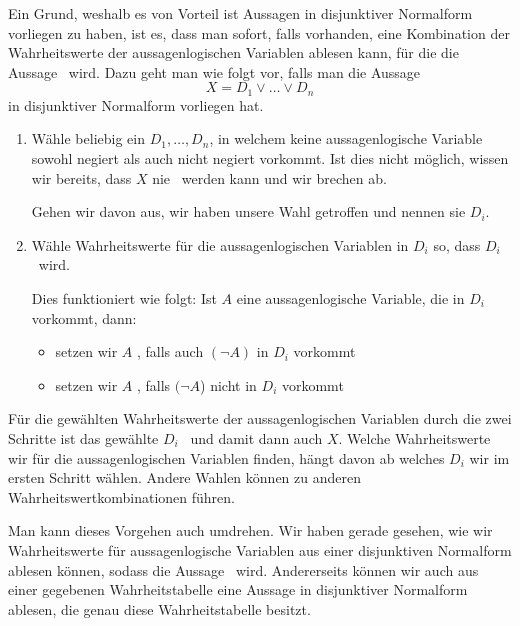 \documentclass[../../main.tex]{subfiles}
\begin{document}
    Ein Grund, weshalb es von Vorteil ist Aussagen in disjunktiver Normalform
    vorliegen zu haben, ist es, dass man sofort, falls vorhanden, 
    eine Kombination der Wahrheitswerte der aussagenlogischen
    Variablen ablesen kann, für die die Aussage \wahr\ wird. 
    Dazu geht man wie folgt vor, falls man 
    die Aussage
    \[X= D_1 \lor \dots \lor D_n\]
    in disjunktiver Normalform vorliegen hat.
    \begin{enumerate}
        \item Wähle beliebig ein $D_1,\dots,D_n$, in welchem keine 
        aussagenlogische Variable sowohl negiert als auch nicht negiert vorkommt. 
        Ist dies nicht möglich, wissen wir bereits, dass $X$ nie \wahr\ werden kann 
        und wir brechen ab.
        
        Gehen wir davon aus, wir haben unsere Wahl getroffen und nennen sie $D_i$.
        \item Wähle Wahrheitswerte für die aussagenlogischen 
        Variablen in $D_i$ so, dass $D_i$ \wahr\  wird.
        
        Dies funktioniert wie folgt: Ist $A$ eine aussagenlogische Variable, die in $D_i$ vorkommt, dann:
            \begin{itemize}
                \item setzen wir $A$ \falsch, falls auch $(\lnot A)$ in $D_i$ vorkommt
                \item setzen wir $A$ \wahr, falls $(\lnot A$) nicht in $D_i$ vorkommt
            \end{itemize}
        
    \end{enumerate}

    Für die gewählten Wahrheitswerte der aussagenlogischen Variablen durch die zwei 
    Schritte ist das gewählte $D_i$ \wahr\ und damit dann auch $X$. Welche 
    Wahrheitswerte wir für die aussagenlogischen Variablen finden, hängt davon ab
    welches $D_i$ wir im ersten Schritt wählen. Andere Wahlen können zu anderen 
    Wahrheitswertkombinationen führen.

    Man kann dieses Vorgehen auch umdrehen. Wir haben gerade gesehen, 
    wie wir Wahrheitswerte für aussagenlogische Variablen
    aus einer disjunktiven Normalform ablesen können, sodass die Aussage \wahr\ wird. Andererseits können wir auch 
    aus einer gegebenen Wahrheitstabelle eine Aussage in disjunktiver Normalform ablesen,
    die genau diese Wahrheitstabelle besitzt.
\end{document}
